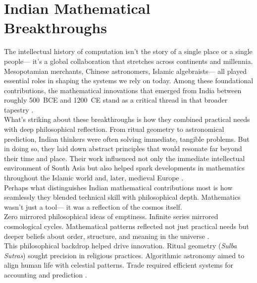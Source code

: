 
\chapter{Indian Mathematical Breakthroughs}

The intellectual history of computation isn’t the story of a single place or a single people---%
it’s a global collaboration that stretches across continents and millennia. Mesopotamian merchants, Chinese astronomers, Islamic algebraists---%
all played essential roles in shaping the systems we rely on today. Among these foundational contributions, the mathematical innovations that emerged from India between roughly 500~BCE and 1200~CE stand as a critical thread in that broader tapestry \cite{wiki_indian_math,vajiram_ravi}.\\

What’s striking about these breakthroughs is how they combined practical needs with deep philosophical reflection. From ritual geometry to astronomical prediction, Indian thinkers were often solving immediate, tangible problems. But in doing so, they laid down abstract principles that would resonate far beyond their time and place. Their work influenced not only the immediate intellectual environment of South Asia but also helped spark developments in mathematics throughout the Islamic world and, later, medieval Europe \cite{mj_college,ukessays_indian_math}.\\

Perhaps what distinguishes Indian mathematical contributions most is how seamlessly they blended technical skill with philosophical depth. Mathematics wasn’t just a tool---%
it was a reflection of the cosmos itself.\\

Zero mirrored philosophical ideas of emptiness. Infinite series mirrored cosmological cycles. Mathematical patterns reflected not just practical needs but deeper beliefs about order, structure, and meaning in the universe \cite{wiki_indian_math}.\\

This philosophical backdrop helped drive innovation. Ritual geometry (\emph{Sulba Sutras}) sought precision in religious practices. Algorithmic astronomy aimed to align human life with celestial patterns. Trade required efficient systems for accounting and prediction \cite{vajiram_ravi}.\\

